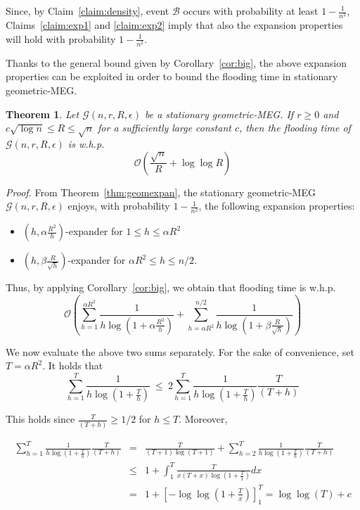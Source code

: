 \documentclass[10pt,a4paper]{article}
\newtheorem{theorem}[definition]{Theorem}
\newcommand{\proof}{\noindent\textit{Proof. }}
\newcommand{\qed}{\hspace{\stretch{1}$\square$}}
\begin{document}
\noindent Since, by Claim~\ref{claim:density}, event $\mathcal{B}$ occurs with probability at least $1 - \frac{1}{n^2}$, Claims~\ref{claim:exp1} and \ref{claim:exp2} imply that also the expansion properties will hold with probability $1 - \frac{1}{n^2}$.
\qed

\noindent Thanks to the general bound given by Corollary~\ref{cor:big}, the above expansion properties can be exploited in order to bound the flooding time in stationary geometric-MEG.

\begin{theorem}\label{thm:geoflooding}
Let $\mathcal{G}(n, r, R, \epsilon)$ be a stationary geometric-MEG. If $r \geqslant 0$ and $c\sqrt{\log n} \leqslant R \leqslant \sqrt{n}$ for a sufficiently large constant $c$, then the flooding time of $\mathcal{G}(n, r, R, \epsilon)$ is w.h.p.
$$
\mathcal{O}\left( \frac{\sqrt{n}}{R} + \log\log R \right)
$$
\end{theorem}
\proof From Theorem~\ref{thm:geomexpan}, the stationary geometric-MEG $\mathcal{G}(n, r, R, \epsilon)$
enjoys, with probability $1 - \frac{1}{n^2}$, the following expansion properties:
\begin{itemize}
\item $(h, \alpha\frac{R^2}{h})$-expander for $1 \leqslant h \leqslant \alpha R^2$
\item $(h, \beta\frac{R}{\sqrt{h}})$-expander for $\alpha R^2 \leqslant h \leqslant n/2$.
\end{itemize}
Thus, by applying Corollary~\ref{cor:big}, we obtain that flooding time is w.h.p.
$$
\mathcal{O}\left( \sum_{h = 1}^{\alpha R^2} \frac{1}{h\log(1 + \alpha\frac{R^2}{h})}  + \sum_{h =
\alpha R^2}^{n/2} \frac{1}{h\log(1 + \beta\frac{R}{\sqrt{h}})}\right)
$$

\noindent We now evaluate the above two sums separately. For the sake of convenience, set $T = \alpha R^2$. It
holds that
$$
\sum_{h = 1}^{T} \frac{1}{h\log(1 + \frac{T}{h})} \ \leqslant\ 2\sum_{h = 1}^{T} \frac{1}{h\log(1 + \frac{T}{h})} \frac{T}{(T + h)}
$$

\noindent This holds since $\frac{T}{(T + h)} \geqslant 1/2$ for $h \leqslant T$. Moreover,

\begin{eqnarray*}
\sum_{h = 1}^{T} \frac{1}{h\log(1 + \frac{T}{h})} \frac{T}{(T + h)}
& = & \frac{T}{(T + 1)\log(T + 1)} + \sum_{h = 2}^{T} \frac{1}{h\log(1 + \frac{T}{h})} \frac{T}{(T + h)} \\
& \leqslant & 1 + \int_1^T \frac{T}{x(T + x)\log(1 + \frac{T}{x})}dx \\
& = & 1 + [ -\log\log (1 + \frac{T}{x})]_1^T = \log\log(T) + c
\end{eqnarray*}
\end{document}

